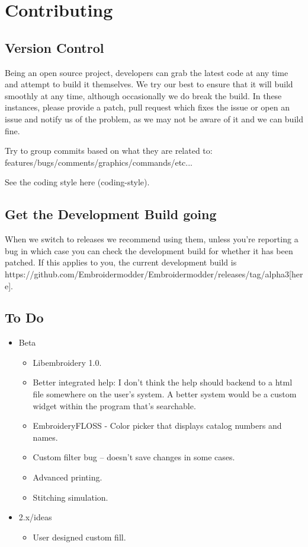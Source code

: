 \section{Contributing}

\subsection{Version Control}

Being an open source project, developers can grab the latest code at any time
and attempt to build it themselves. We try our best to ensure that it will build smoothly
at any time, although occasionally we do break the build. In these instances,
please provide a patch, pull request which fixes the issue or open an issue and
notify us of the problem, as we may not be aware of it and we can build fine.

Try to group commits based on what they are related to: features/bugs/comments/graphics/commands/etc...

See the coding style  here (coding-style).

\subsection{Get the Development Build going}

When we switch to releases we recommend using them, unless you're reporting a bug in which case you can check the development build for whether it has been patched. If this applies to you, the current development build is https://github.com/Embroidermodder/Embroidermodder/releases/tag/alpha3[here].

\subsection{To Do}

\begin{itemize}
\item Beta
\begin{itemize}
\item Libembroidery 1.0.
\item Better integrated help: I don't think the help should backend to a html file somewhere on the user's system. A better system would be a custom widget within the program that's searchable.
\item EmbroideryFLOSS - Color picker that displays catalog numbers and names.
\item Custom filter bug -- doesn't save changes in some cases.
\item Advanced printing.
\item Stitching simulation.
\end{itemize}
\item 2.x/ideas
\begin{itemize}
\item User designed custom fill.
\end{itemize}
\end{itemize}

